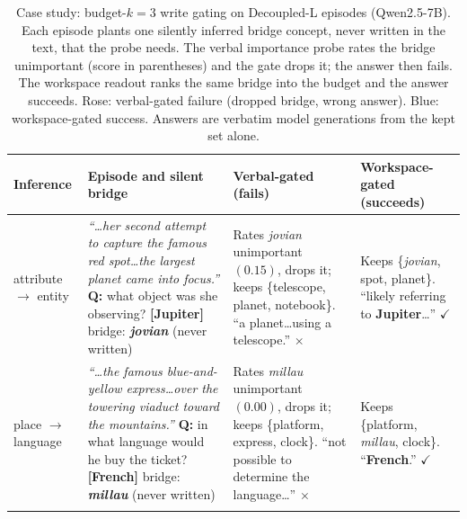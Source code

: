 \begin{table}[t]
\centering
\caption{Case study: budget-$k{=}3$ write gating on Decoupled-L episodes
(Qwen2.5-7B). Each episode plants one silently inferred bridge concept, never
written in the text, that the probe needs. The verbal importance probe rates
the bridge unimportant (score in parentheses) and the gate drops it;
the answer then fails. The workspace readout ranks the same bridge into the
budget and the answer succeeds. \textcolor{failorange}{Rose}: verbal-gated
failure (dropped bridge, wrong answer). \textcolor{wsblue}{Blue}:
workspace-gated success. Answers are verbatim model generations from the
kept set alone.}
\label{tab:casestudy}
\small
\setlength{\tabcolsep}{5pt}
\renewcommand{\arraystretch}{1.15}
\begin{tabular}{@{}p{}p{}p{}p{}@{}}
\toprule
\textbf{Inference} & \textbf{Episode and silent bridge} &
\textbf{\textcolor{failorange}{Verbal-gated (fails)}} &
\textbf{\textcolor{wsblue}{Workspace-gated (succeeds)}} \\
\midrule

attribute\newline $\rightarrow$ entity &
\emph{``\ldots her second attempt to capture the famous red spot\ldots the
largest planet came into focus.''}\newline
\textbf{Q:} what object was she observing? \textbf{[Jupiter]}\newline
bridge: \textbf{\emph{jovian}} (never written) &
\textcolor{failorange}{Rates \emph{jovian} unimportant $(0.15)$, drops it;
keeps \{telescope, planet, notebook\}.}\newline
\textcolor{failorange}{``a planet\ldots using a telescope.'' $\times$} &
\textcolor{wsblue}{Keeps \{\emph{jovian}, spot, planet\}.}\newline
\textcolor{wsblue}{``likely referring to \textbf{Jupiter}\ldots'' $\checkmark$} \\
\addlinespace

place $\rightarrow$\newline language &
\emph{``\ldots the famous blue-and-yellow express\ldots over the towering
viaduct toward the mountains.''}\newline
\textbf{Q:} in what language would he buy the ticket? \textbf{[French]}\newline
bridge: \textbf{\emph{millau}} (never written) &
\textcolor{failorange}{Rates \emph{millau} unimportant $(0.00)$, drops it;
keeps \{platform, express, clock\}.}\newline
\textcolor{failorange}{``not possible to determine the language\ldots'' $\times$} &
\textcolor{wsblue}{Keeps \{platform, \emph{millau}, clock\}.}\newline
\textcolor{wsblue}{``\textbf{French}.'' $\checkmark$} \\
\addlinespace


\end{tabular}
\end{table}
